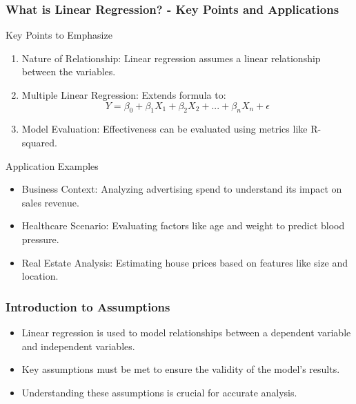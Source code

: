 \documentclass[aspectratio=169]{beamer}
\begin{document}
\begin{frame}[fragile]
    \frametitle{What is Linear Regression? - Key Points and Applications}
    
    \begin{block}{Key Points to Emphasize}
        \begin{enumerate}
            \item Nature of Relationship: Linear regression assumes a linear relationship between the variables.
            \item Multiple Linear Regression: Extends formula to:
            \begin{equation}
                Y = \beta_0 + \beta_1 X_1 + \beta_2 X_2 + ... + \beta_n X_n + \epsilon
            \end{equation}
            \item Model Evaluation: Effectiveness can be evaluated using metrics like R-squared.
        \end{enumerate}
    \end{block}

    \begin{block}{Application Examples}
        \begin{itemize}
            \item Business Context: Analyzing advertising spend to understand its impact on sales revenue.
            \item Healthcare Scenario: Evaluating factors like age and weight to predict blood pressure.
            \item Real Estate Analysis: Estimating house prices based on features like size and location.
        \end{itemize}
    \end{block}
    
\end{frame}

\begin{frame}[fragile]
    \frametitle{Introduction to Assumptions}
    \begin{itemize}
        \item Linear regression is used to model relationships between a dependent variable and independent variables.
        \item Key assumptions must be met to ensure the validity of the model's results.
        \item Understanding these assumptions is crucial for accurate analysis.
    \end{itemize}
\end{frame}
\end{document}
